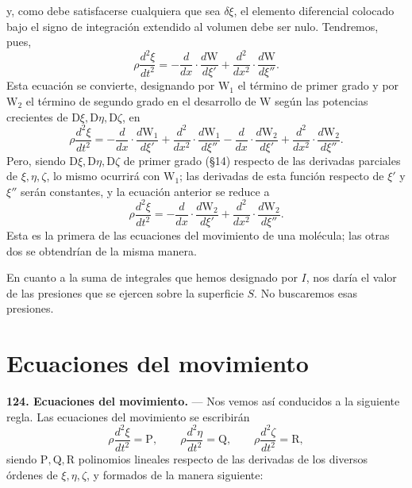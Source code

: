 y, como debe satisfacerse cualquiera que sea $\delta\xi$, el elemento
diferencial colocado bajo el signo de integración extendido al volumen debe
ser nulo. Tendremos, pues,
\[
\rho\frac{d^2\xi}{dt^2} = -\frac{d}{dx}\cdot\frac{d\mathrm{W}}{d\xi'}
+\frac{d^2}{dx^2}\cdot\frac{d\mathrm{W}}{d\xi''}.
\]
Esta ecuación se convierte, designando por $\mathrm{W}_1$ el término de primer
grado y por $\mathrm{W}_2$ el término de segundo grado en el desarrollo de $\mathrm{W}$
según las potencias crecientes de $\mathrm{D}\xi,\mathrm{D}\eta,\mathrm{D}\zeta$, en
\[
\rho\frac{d^2\xi}{dt^2} = -\frac{d}{dx}\cdot\frac{d\mathrm{W}_1}{d\xi'}
+\frac{d^2}{dx^2}\cdot\frac{d\mathrm{W}_1}{d\xi''}
-\frac{d}{dx}\cdot\frac{d\mathrm{W}_2}{d\xi'}+\frac{d^2}{dx^2}\cdot\frac{d\mathrm{W}_2}{d\xi''}.
\]
Pero, siendo $\mathrm{D}\xi,\mathrm{D}\eta,\mathrm{D}\zeta$ de primer grado (§14) respecto de las
derivadas parciales de $\xi,\eta,\zeta$, lo mismo ocurrirá con $\mathrm{W}_1$; las
derivadas de esta función respecto de $\xi'$ y $\xi''$ serán constantes, y
la ecuación anterior se reduce a
\[
\rho\frac{d^2\xi}{dt^2} = -\frac{d}{dx}\cdot\frac{d\mathrm{W}_2}{d\xi'}
+\frac{d^2}{dx^2}\cdot\frac{d\mathrm{W}_2}{d\xi''}.
\]
Esta es la primera de las ecuaciones del movimiento de una molécula; las
otras dos se obtendrían de la misma manera.

En cuanto a la suma de integrales que hemos designado por $I$, nos daría el
valor de las presiones que se ejercen sobre la superficie $S$. No
buscaremos esas presiones.

\section{Ecuaciones del movimiento}

\noindent\textbf{124. Ecuaciones del movimiento.} — Nos vemos así
conducidos a la siguiente regla. Las ecuaciones del movimiento se escribirán
\[
\rho\frac{d^2\xi}{dt^2}=\mathrm P,\qquad
\rho\frac{d^2\eta}{dt^2}=\mathrm Q,\qquad
\rho\frac{d^2\zeta}{dt^2}=\mathrm R,
\]
siendo $\mathrm P,\mathrm Q,\mathrm R$ polinomios lineales respecto de las
derivadas de los diversos órdenes de $\xi,\eta,\zeta$, y formados de la
manera siguiente:

